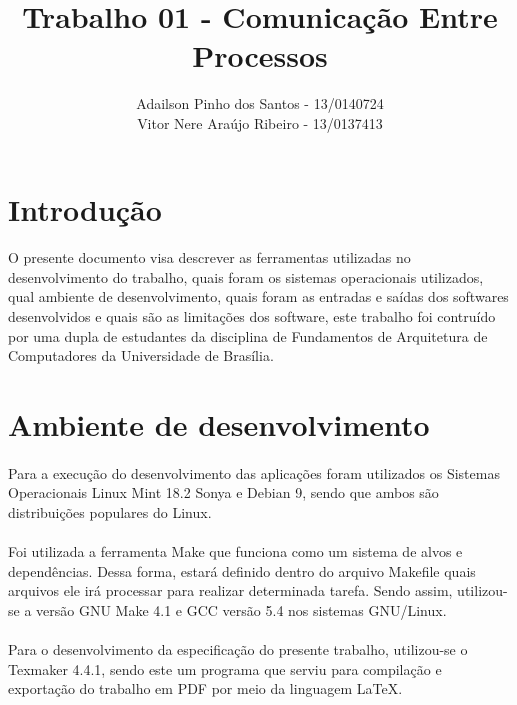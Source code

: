 \documentclass[11pt]{article}
\begin{document}
\title{Trabalho 01 - Comunica\c{c}\~ao Entre Processos}
\author{Adailson Pinho dos Santos - 13/0140724\\
Vitor Nere Ara\'ujo Ribeiro - 13/0137413}
\date{}
\maketitle

\newpage

\tableofcontents

\newpage

\section{Introdu\c{c}\~ao}
	\paragraph{}	O presente documento visa descrever as ferramentas utilizadas no desenvolvimento do trabalho, quais foram os sistemas operacionais utilizados, qual ambiente de desenvolvimento, quais foram as entradas e sa\'idas dos softwares desenvolvidos e quais s\~ao as limita\c{c}\~oes dos software, este trabalho foi contru\'ido por uma dupla de estudantes da disciplina de Fundamentos de Arquitetura de Computadores da Universidade de Bras\'ilia. 
\section{Ambiente de desenvolvimento}
    \paragraph{}	Para a execu\c{c}\~ao do desenvolvimento das aplica\c{c}\~oes foram utilizados os Sistemas Operacionais Linux Mint 18.2 Sonya e Debian 9, sendo que ambos s\~ao distribui\c{c}\~oes populares do Linux. 
    \paragraph{}	Foi utilizada a ferramenta Make que funciona como um sistema de alvos e depend\^encias. Dessa forma, estar\'a definido dentro do arquivo Makefile quais arquivos ele ir\'a processar para realizar determinada tarefa. Sendo assim, utilizou-se a vers\~ao GNU Make 4.1 e GCC vers\~ao 5.4 nos sistemas GNU/Linux.
    \paragraph{}	Para o desenvolvimento da especifica\c{c}\~ao do presente trabalho, utilizou-se o Texmaker 4.4.1, sendo este um programa que serviu para compila\c{c}\~ao e exporta\c{c}\~ao do trabalho em PDF por meio da linguagem LaTeX.
\end{document}

